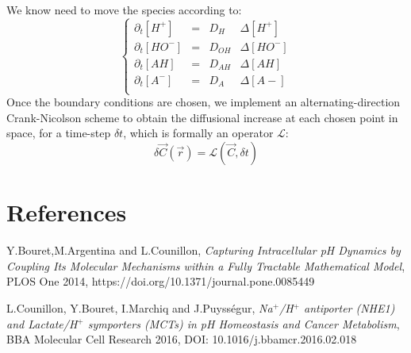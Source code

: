 \documentclass[aps,11pt]{revtex4}
\begin{document}
We know need to move the species according to:
\begin{equation}
\label{eq:move}
\left\lbrace
\begin{array}{lcll}
\partial_t [H^+]  & = & D_{H}  &\Delta [H^+]\\
\partial_t [HO^-] & = & D_{OH} &\Delta [HO^-]\\
\partial_t [AH]   & = & D_{AH} &\Delta [AH]\\
\partial_t [A^-]  & = & D_{A}  &\Delta [A-]\\
\end{array}
\right.
\end{equation}
Once the boundary conditions are chosen, we implement an alternating-direction Crank-Nicolson scheme to obtain
the diffusional increase at each chosen point in space, for a time-step $\delta t$, which is formally an operator $\mathcal{L}$:
\begin{equation}
	\delta \vec{C}(\vec{r}) = \mathcal{L}(\vec{C},\delta t)
\end{equation}
   
  
\section{References}
\begin{thebibliography}{1}

	Y.Bouret,M.Argentina and L.Counillon,
	\textit{Capturing Intracellular pH Dynamics by Coupling Its Molecular Mechanisms within a Fully Tractable Mathematical Model},
	PLOS One 2014,
	https://doi.org/10.1371/journal.pone.0085449


	L.Counillon, Y.Bouret, I.Marchiq and J.Puyss\'egur,
	\textit{{Na$^+$/H$^+$ antiporter (NHE1) and Lactate/H$^+$ symporters (MCTs)
	 in pH Homeostasis and Cancer Metabolism}},
	 BBA Molecular Cell Research 2016,
	 DOI: 10.1016/j.bbamcr.2016.02.018

\end{thebibliography}
\end{document}
